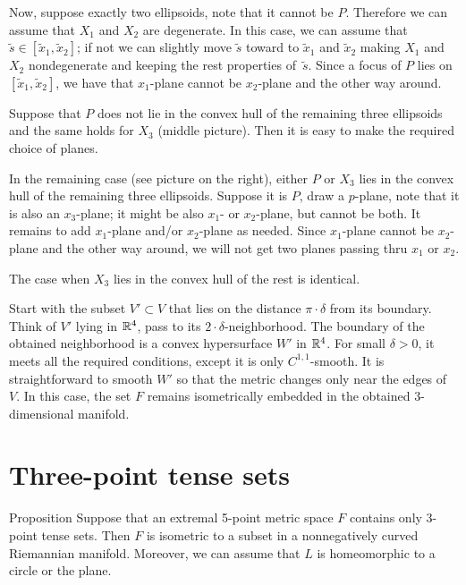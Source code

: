 \documentclass{article}
\begin{document}
Now, suppose exactly two ellipsoids, note that it cannot be $P$.
Therefore we can assume that $X_1$ and $X_2$ are degenerate.
In this case, we can assume that $\tilde s\in[\tilde x_1,\tilde x_2]$;
if not we can slightly move $\tilde s$ toward to $\tilde x_1$ and $\tilde x_2$ making $X_1$ and $X_2$ nondegenerate and keeping the rest properties of~$\tilde s$.
Since a focus of $P$ lies on $[\tilde x_1,\tilde x_2]$, we have that $x_1$-plane cannot be $x_2$-plane and the other way around.

Suppose that $P$ does not lie in the convex hull of the remaining three ellipsoids
and the same holds for $X_3$ (middle picture).
Then it is easy to make the required choice of planes.

In the remaining case (see picture on the right), either $P$ or $X_3$ lies in the convex hull of the remaining three ellipsoids.
Suppose it is $P$, draw a $p$-plane, note that it is also an $x_3$-plane;
it might be also $x_1$- or $x_2$-plane, but cannot be both.
It remains to add $x_1$-plane and/or $x_2$-plane as needed.
Since $x_1$-plane cannot be $x_2$-plane and the other way around, we will not get two planes passing thru $x_1$ or $x_2$.

The case when $X_3$ lies in the convex hull of the rest is identical.

Start with the subset $V'\subset V$ that lies on the distance $\pi\cdot\delta$ from its boundary.
Think of $V'$ lying in $\mathbb{R}^4$, pass to its $2\cdot \delta$-neighborhood.
The boundary of the obtained neighborhood is a convex hypersurface $W'$ in $\mathbb{R}^4$.
For small $\delta>0$, it meets all the required conditions, except it is only $C^{1,1}$-smooth.
It is straightforward to smooth $W'$ so that the metric changes only near the edges of~$V$.
In this case, the set $F$ remains isometrically embedded in the obtained 3-dimensional manifold.
\qeds


\section{Three-point tense sets}\label{sec:3-tense}

\begin{thm}{Proposition}\label{prop:3-tense}
Suppose that an extremal 5-point metric space $F$ contains only 3-point tense sets.
Then $F$ is isometric to a subset in a nonnegatively curved Riemannian manifold.
Moreover, we can assume that $L$ is homeomorphic to a circle or the plane.
\end{thm}
\end{document}
